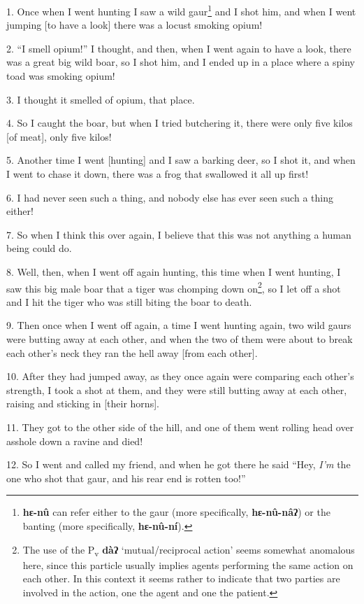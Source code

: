 \setcounter{footnote}{0}

1. Once when I went hunting I saw a wild gaur\footnote{\textbf{hɛ-nû} can refer either to the gaur (more specifically, \textbf{hɛ-nû-nâʔ}) or the banting (more specifically, \textbf{hɛ-nû-ní}).} and I shot him, and when I went
jumping [to have a look] there was a locust smoking opium!

2. ``I smell opium!'' I thought, and then, when I went again to have a look, there
was a great big wild boar, so I shot him, and I ended up in a place where a spiny
toad was smoking opium!

3. I thought it smelled of opium, that place.

4. So I caught the boar, but when I tried butchering it, there were only five kilos
[of meat], only five kilos!

5. Another time I went [hunting] and I saw a barking deer, so I shot it, and when
I went to chase it down, there was a frog that swallowed it all up first!

6. I had never seen such a thing, and nobody else has ever seen such a thing either!

7. So when I think this over again, I believe that this was not anything a human
being could do.

8. Well, then, when I went off again hunting, this time when I went hunting, I saw
this big male boar that a tiger was chomping down on\footnote{The use of the P\textsubscript{v} \textbf{dàʔ} `mutual/reciprocal action' seems somewhat anomalous here, since this particle usually implies agents performing the same action on each other. In this context it seems rather to indicate that two parties are involved in the action, one the agent and one the patient.}, so I let off a shot and
I hit the tiger who was still biting the boar to death.

9. Then once when I went off again, a time I went hunting again, two wild gaurs
were butting away at each other, and when the two of them were about to break each
other's neck they ran the hell away [from each other].

10. After they had jumped away, as they once again were comparing each other's strength,
I took a shot at them, and they were still butting away at each other, raising
and sticking in [their horns].

11. They got to the other side of the hill, and one of them went rolling head over
asshole down a ravine and died!

12. So I went and called my friend, and when he got there he said ``Hey, \textit{I'm}
the one who shot that gaur, and his rear end is rotten too!''

